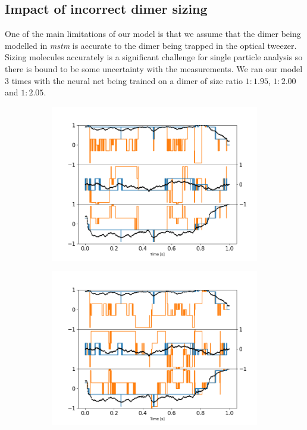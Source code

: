 \subsection{Impact of incorrect dimer sizing}
\label{sec:lam}

One of the main limitations of our model is that we assume that 
the dimer being modelled in \textit{mstm} is accurate to the 
dimer being trapped in the optical tweezer. Sizing molecules 
accurately is a significant challenge for single particle 
analysis so there is bound to be some uncertainty with the 
measurements. We ran our model 3 times with the neural net being 
trained on a dimer of size ratio $1:1.95$, $1:2.00$ and $1:2.05$.
\begin{figure}[h!]
	\centering
	\begin{subfigure}{0.33\textwidth}
		\subcaption{}
		\includegraphics[width =\textwidth]{fig8a.png}
	\end{subfigure}
	\begin{subfigure}{0.31\textwidth}
		\subcaption{}
		\includegraphics[width=\textwidth]{fig8b.png}

\end{subfigure}
\end{figure}
